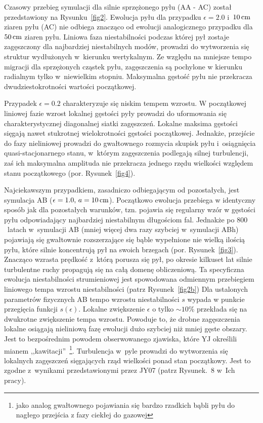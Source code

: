 Czasowy przebieg symulacji dla silnie sprzężonego pyłu (AA - AC) został
przedstawiony na Rysunku~\ref{fig2}. Ewolucja pyłu dla przypadku $\epsilon =
2.0$ i~$10\hbox{$\thinspace\textrm{cm}$}$ ziaren pyłu (AC) nie odbiega znacząco od ewolucji analogicznego
przypadku dla $50\hbox{$\thinspace\textrm{cm}$}$ ziaren pyłu. Liniowa faza niestabilności podczas której
pył zostaje zagęszczony dla najbardziej niestabilnych modów, prowadzi do
wytworzenia się struktur wydłużonych w~kierunku wertykalnym. Ze względu na
mniejsze tempo migracji dla sprzężonych cząstek pyłu, zagęszczenia są pochylone
w kierunku radialnym tylko w~niewielkim stopniu. Maksymalna gęstość pyłu nie
przekracza dwudziestokrotności wartości początkowej.
\par Przypadek $\epsilon = 0.2$ charakteryzuje się niskim tempem wzrostu. W
początkowej liniowej fazie wzrost lokalnej gęstości pyły prowadzi do uformowania
się charakterystycznej diagonalnej siatki zagęszczeń. Lokalne maksima gęstości
sięgają nawet stukrotnej wielokrotności gęstości początkowej. Jednakże, przejście
do fazy nieliniowej prowadzi do gwałtownego rozmycia skupisk pyłu i~osiągnięcia
quasi-stacjonarnego stanu, w~którym zagęszczenia podlegają silnej turbulencji,
zaś ich maksymalna amplituda nie przekracza jednego rzędu wielkości względem
stanu początkowego (por. Rysunek~\ref{fig4}).

\par Najciekawszym przypadkiem, zasadniczo odbiegającym od pozostałych, jest
symulacja AB ($\epsilon=1.0,\, a=10\hbox{$\thinspace\textrm{cm}$}$). Początkowo ewolucja przebiega w
identyczny sposób jak dla pozostałych warunków, tzn. pojawia się regularny wzór
w gęstości pyłu odpowiadający najbardziej niestabilnym długościom fal. Jednakże 
po $800$~latach w~symulacji AB (mniej więcej dwa razy szybciej w~symulacji ABh)
pojawiają się gwałtownie rozszerzające się bąble wypełnione nie wielką ilością
pyłu, które silnie koncentrują pył na swoich brzegach (por. Rysunek~\ref{fig3}). 
Znacząco wzrasta prędkość z~którą porusza się pył, po okresie kilkuset lat
silnie turbulentne ruchy propagują się na całą domenę obliczeniową. Ta
specyficzna ewolucja niestabilności strumieniowej jest spowodowana odmiennym
przebiegiem liniowego tempa wzrostu niestabilności (patrz Rysunek~\ref{fig2b})
Dla ustalonych parametrów fizycznych AB tempo wzrostu niestabilności $s$ wypada
w punkcie przegięcia funkcji $s(\epsilon)$. Lokalne zwiększenie $\epsilon$ o
tylko $\sim10\%$ przekłada się na dwukrotne zwiększenie tempa wzrostu. Powoduje
to, że drobne zagęszczenia lokalne osiągają nieliniową fazę ewolucji dużo
szybciej niż mniej gęste obszary.  Jest to bezpośrednim powodem obserwowanego
zjawiska, które YJ określili mianem ,,kawitacji''~\footnote{jako analog
gwałtownego pojawiania się bardzo rzadkich bąbli pyłu do nagłego przejścia z
fazy ciekłej do gazowej}.  Turbulencja w~pyle prowadzi do wytworzenia się
lokalnych zagęszczeń sięgających rząd wielkości ponad stan początkowy. Jest to
zgodne z~wynikami przedstawionymi przez JY07 (patrz Rysunek.~8 w~Ich pracy).

